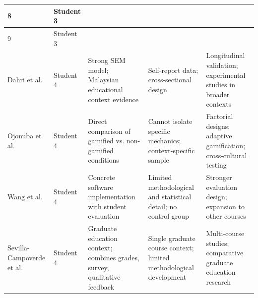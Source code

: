 \documentclass[12pt,a4paper]{article}
\begin{document}
\begin{table}[H]
{\begin{tabular}{|C{2cm}|L{2cm}|L{4.5cm}|L{4cm}|L{4cm}|}
8 & Student 3 & & & 
\tabularnewline
\hline

9 & Student 3 & & & 
\tabularnewline
\hline

Dahri et al. & 
Student 4 & 
Strong SEM model; Malaysian educational context evidence & 
Self-report data; cross-sectional design & 
Longitudinal validation; experimental studies in broader contexts
\tabularnewline
\hline

Ojonuba et al. & 
Student 4 & 
Direct comparison of gamified vs. non-gamified conditions & 
Cannot isolate specific mechanics; context-specific sample & 
Factorial designs; adaptive gamification; cross-cultural testing
\tabularnewline
\hline

Wang et al. & 
Student 4 & 
Concrete software implementation with student evaluation & 
Limited methodological and statistical detail; no control group & 
Stronger evaluation design; expansion to other courses
\tabularnewline
\hline

Sevilla-Campoverde et al. & 
Student 4 & 
Graduate education context; combines grades, survey, qualitative feedback & 
Single graduate course context; limited methodological development & 
Multi-course studies; comparative graduate education research
\tabularnewline
\hline

\end{tabular}%
}

\end{table}
\end{document}
